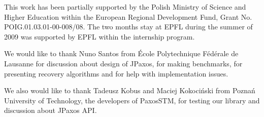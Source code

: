 This work has been partially supported by the Polish Ministry of Science and
Higher Education within the European Regional Development Fund, Grant No.
POIG.01.03.01-00-008/08.  The two months stay at EPFL during the summer of 2009
was supported by EPFL within the internship program.

\noindent We would like to thank Nuno Santos from École Polytechnique Fédérale
de Lausanne for discussion about design of JPaxos, for making benchmarks, for
presenting recovery algorithms and for help with implementation issues. 

We also
would like to thank Tadeusz Kobus and Maciej Kokociński from Poznań University
of Technology, the developers of PaxosSTM, for testing our library and
discussion about JPaxos API.

\cleardoublepage
